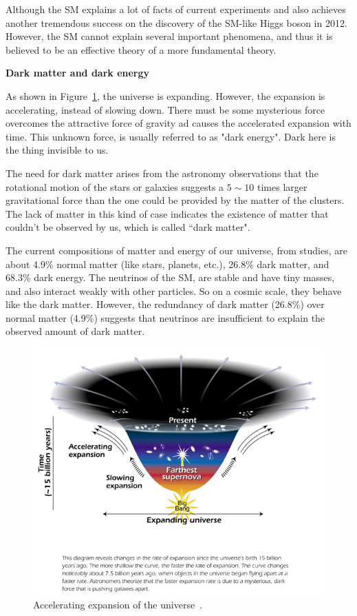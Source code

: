 Although the SM explains a lot of facts of current experiments and also achieves another tremendous success on 
the discovery of the SM-like Higgs boson in 2012. However, the SM cannot explain several
important phenomena, and thus it is believed to be an effective theory of a more fundamental
theory. 

{\bf Dark matter and dark energy}

As shown in Figure~\ref{fig:universe}, the universe is expanding. However, the expansion is accelerating, instead of slowing down. 
There must be some mysterious force overcomes the attractive force of gravity ad  
causes the accelerated expansion with time. 
This unknown force, is usually referred to as "dark energy". Dark here is 
the thing invisible to us. 

The need for dark matter arises from the astronomy observations that the rotational motion of 
the stars or galaxies suggests a $5{\sim}10$ times larger gravitational force than the one could be provided 
by the matter of the clusters. The lack of matter in this kind of case indicates the existence of 
matter that couldn't be observed by us, which is called ``dark matter".   
 
The current compositions of matter and energy of our universe, from studies, are about 4.9\% normal matter (like stars, planets, etc.), 26.8\% dark matter, and 68.3\% dark energy. The neutrinos of the SM, are stable and have tiny masses, and also interact weakly with other particles. So on a cosmic scale, they behave like 
the dark matter. However, the redundancy of dark matter (26.8\%) over normal matter (4.9\%) suggests that neutrinos are insufficient to explain the observed amount of dark matter. 

\begin{figure}[htbp]
\centering
\includegraphics[width=.7\textwidth]{figures/accelerating_universe.jpg}
\caption{Accelerating expansion of the universe~\cite{web:nasa}.}
\label{fig:universe}
\end{figure}  



